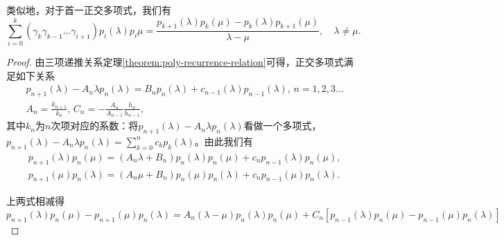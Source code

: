 \begin{subappendices}
\begin{theorem}
  类似地，对于首一正交多项式，我们有
  \begin{equation*}
    \sum_{i=0}^{k} \left( \gamma_k \gamma_{k-1} \ldots \gamma_{i+1} \right) p_{i}(\lambda) p_{i} \mu = \frac{
    p_{k+1}(\lambda) p_{k}(\mu) - p_{k}(\lambda) p_{k+1} (\mu)
    }{\lambda - \mu}, \quad \lambda \neq \mu.
  \end{equation*}
\end{theorem}

\begin{proof}
由三项递推关系定理\eqref{theorem:poly-recurrence-relation}可得，正交多项式满足如下关系
\begin{equation*}
\begin{split}
  &p_{n+1}(\lambda) -A_n \lambda p_n(\lambda) = B_n p_n(\lambda) + c_{n-1}(\lambda) p_{n-1}(\lambda), \, n=1,2,3 \ldots \\
  &A_n = \frac{k_{n+1}}{k_{n}}, \, C_n = -\frac{A_n}{A_{n-1}} \frac{h_n}{h_{n-1}},
\end{split}
\end{equation*}
其中$k_n$为$n$次项对应的系数：将$p_{n+1}(\lambda) - A_n \lambda p_{n}(\lambda)$看做一个多项式，$p_{n+1}(\lambda) - A_n \lambda p_{n}(\lambda) = \sum_{k=0}^{n} c_k p_k(\lambda)$。由此我们有
\begin{align*}
  &p_{n+1}(\lambda) p_{n}(\mu) = (A_n \lambda + B_n) p_n(\lambda) p_n(\mu) + c_n p_{n-1}(\lambda) p_{n}(\mu),\\
  &p_{n+1}(\mu) p_{n}(\lambda) = (A_n \mu + B_n) p_n(\mu) p_n(\lambda) + c_n p_{n-1}(\mu) p_{n}(\lambda).
\end{align*}

上两式相减得
\begin{equation*}
p_{n+1}(\lambda) p_{n}(\mu) - p_{n+1}(\mu) p_{n}(\lambda) = A_n (\lambda - \mu) p_n(\lambda) p_{n}(\mu) + C_n \left[p_{n-1}(\lambda) p_n(\mu) - p_{n-1}(\mu) p_{n}(\lambda) \right]
\end{equation*}


\end{proof}
\end{subappendices}
